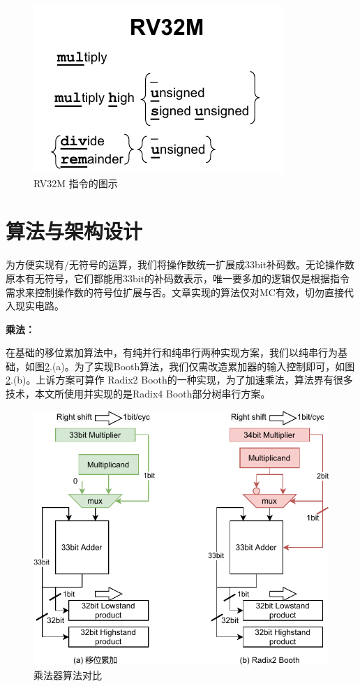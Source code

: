 \documentclass[UTF8,12pt,punct=kaiming,fontset=none]{article}
\begin{document}
    \begin{figure}[H]
        \centering
        \includegraphics[scale=1]{RV32M.pdf}
        \caption{RV32M 指令的图示}
        \label{fig1}
    \end{figure}

    \section{算法与架构设计}
    为方便实现有/无符号的运算，我们将操作数统一扩展成33bit补码数。无论操作数原本有无符号，它们都能用33bit的补码数表示，唯一要多加的逻辑仅是根据指令需求来控制操作数的符号位扩展与否。文章实现的算法仅对MC有效，切勿直接代入现实电路。
    \newline

    \textbf{乘法：}

    在基础的移位累加算法中，有纯并行和纯串行两种实现方案，我们以纯串行为基础，如图\ref{fig2}.(a)。为了实现Booth算法，我们仅需改造累加器的输入控制即可，如图\ref{fig2}.(b)。上诉方案可算作 Radix2 Booth的一种实现，为了加速乘法，算法\cite{parhami2010computer}界有很多技术，本文所使用并实现的是Radix4 Booth部分树串行方案。
    \newline
    \begin{figure}[H]
	    \centering
	    \includegraphics[scale=1]{mul.pdf}
	    \caption{乘法器算法对比}
	    \label{fig2}
    \end{figure}
\end{document}
